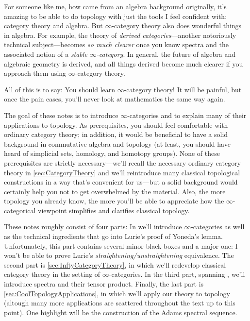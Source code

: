 \documentclass[DIV=12,numbers=enddot,leqno,bibliography=totoc]{scrartcl}
\begin{document}
\begin{numpar}
		For someone like me, how came from an algebra background originally, it's amazing to be able to do topology with just the tools I feel confident with: category theory and algebra. But $\infty$-category theory also does wonderful things in algebra. For example, the theory of \emph{derived categories}---another notoriously technical subject---becomes \emph{so much clearer} once you know spectra and the associated notion of a \emph{stable $\infty$-category}. In general, the future of algebra and algebraic geometry is derived, and all things derived become much clearer if you approach them using $\infty$-category theory.
		
		All of this is to say: You should learn $\infty$-category theory! It will be painful, but once the pain eases, you'll never look at mathematics the same way again.
		
		
	\end{numpar}
	\begin{numpar}
		The goal of these notes is to introduce $\infty$-categories and to explain many of their applications to topology. As prerequisites, you should feel comfortable with ordinary category theory; in addition, it would be beneficial to have a solid background in commutative algebra and topology (at least, you should have heard of simplicial sets, homology, and homotopy groups). None of these prerequisites are strictly necessary---we'll recall the necessary ordinary category theory in \cref{sec:CategoryTheory} and we'll reintroduce many classical topological constructions in a way that's convenient for us---but a solid background would certainly help you not to get overwhelmed by the material. Also, the more topology you already know, the more you'll be able to appreciate how the $\infty$-categorical viewpoint simplifies and clarifies classical topology.
		
		These notes roughly consist of four parts: In  we'll introduce $\infty$-categories as well as the technical ingredients that go into Lurie's proof of Yoneda's lemma. Unfortunately, this part contains several minor black boxes and a major one: I won't be able to prove Lurie's \emph{straightening/unstraightening} equivalence. The second part is \cref{sec:InftyCategoryTheory}, in which we'll redevelop classical category theory in the setting of $\infty$-categories. In the third part, spanning , we'll introduce spectra and their tensor product. Finally, the last part is \cref{sec:CoolTopologyApplications}, in which we'll apply our theory to topology (altough many more applications are scattered throughout the text up to this point). One highlight will be the construction of the Adams spectral sequence.
	\end{numpar}
	
\end{document}
